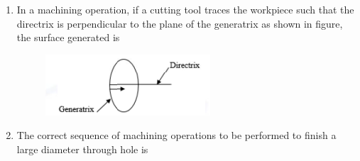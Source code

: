 \documentclass[journal]{IEEEtran}
\begin{document}
\begin{enumerate}
\begin{enumerate}
\end{enumerate}

\hfill{}

\item 

In a machining operation, if a cutting tool traces the workpiece such that the
directrix is perpendicular to the plane of the generatrix as shown in figure,
the surface generated is
\begin{figure}[h]
\centering
\includegraphics[width=0.5\columnwidth]{Figs/image (42).png}
\caption*{}
\label{fig:7}
\end{figure}

\begin{enumerate}
\end{enumerate}

\hfill{}

\item The correct sequence of machining operations to be performed to finish a
large diameter through hole is

\begin{enumerate}
\end{enumerate}


\end{enumerate}
\end{document}
